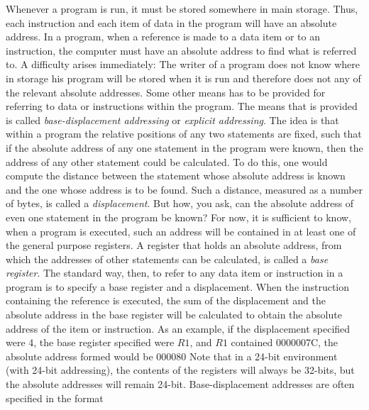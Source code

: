 \documentclass{report}
\begin{document}
\begin{itemize}
            \bigbreak \noindent 
            Whenever a program is run, it must be stored somewhere in main storage. Thus, each instruction and each item of data in the program will have an absolute address. In a program, when a reference is made to a data item or to an instruction, the computer must have an absolute address to find what is referred to.
            \bigbreak \noindent 
            A difficulty arises immediately: The writer of a program does not know where in storage his program will be stored when it is run and therefore does not  any of the relevant absolute addresses. Some other means has to be provided for referring to data or instructions within the program.
            \bigbreak \noindent 
            The means that is provided is called \textit{base-displacement addressing} or  \textit{explicit addressing}. The idea is that within  a program the relative positions of any two statements are fixed, such that if the absolute address of any one statement in the program were known, then the address of any other statement could be calculated. To do this, one would compute the distance between the statement whose absolute address is known and the one whose address is to be found. Such a distance, measured as a number of bytes, is called a \textit{displacement}.
            \bigbreak \noindent 
            But how, you ask, can the absolute address of even one statement in the program be known? For now, it is sufficient to know, when a program is executed, such an address will be contained in at least one of the general purpose registers. A register that holds an absolute address, from which the addresses of other statements can be calculated, is called a \textit{base register}.
            \bigbreak \noindent 
            The standard way, then, to refer to any data item or instruction in a program is to specify a base register and a displacement. When the instruction containing the reference is executed, the sum of the displacement and the absolute address in the base register will be calculated to obtain the absolute address of the item or instruction.
            \bigbreak \noindent 
            As an example, if the displacement specified were 4, the base register specified were $R1$, and $R1$ contained 0000007C, the absolute address formed would be 000080
            \bigbreak \noindent 
            Note that in a 24-bit environment (with 24-bit addressing), the contents of the registers will always be 32-bits, but the absolute addresses will remain 24-bit.
            \bigbreak \noindent 
            Base-displacement addresses are often specified in the format

\end{itemize}
\end{document}
